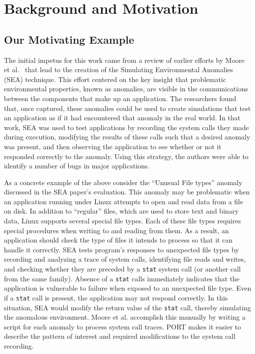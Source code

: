 \section{Background and Motivation}
\label{SEC:background}


\subsection{Our Motivating Example}
\label{sec:MotivatingExample}

The initial impetus for this work came from a review
of earlier efforts by Moore et al.~\cite{DBLP:conf/issre/MooreCFW19}
that lead to the creation of
the Simulating Environmental Anomalies (SEA) technique.
This effort centered on the key insight
that problematic
environmental properties,
known as anomalies, are visible in the
communications between the components that make up an application.
The researchers found that,
once captured,
these anomalies
could be
used to create simulations
that test
an application as if
it had encountered that anomaly
in the real world.
In that work, SEA was used to test applications
by recording the system calls they made
during execution,
modifying the results of these calls such that a desired anomaly
was present,
and then observing the application to see whether or not it
responded correctly to the anomaly.
Using this strategy, the authors were able to identify a number of bugs
in major applications.

As a concrete example of the above
consider the ``Unusual File types'' anomaly
discussed in the SEA paper's evaluation.
This anomaly may be problematic
when an application running under Linux
attempts to open and read data from a file on disk.
In addition to ``regular'' files,
which are used to store text and
binary data,
Linux supports several special file types.
Each of these file types requires special procedures when writing to and
reading from them.
As a result, an application should check the type of files it intends to
process so that it can handle it correctly.
SEA tests program's responses
to unexpected file types
by recording and analyzing a trace of system calls,
identifying file reads and writes,
and checking whether they are preceded by a {\tt stat}
system call (or another call from the same family).
Absence of a {\tt stat} calls
immediately indicates
that the application is vulnerable
to failure
when exposed to an unexpected file type.
Even if a {\tt stat} call is present,
the application may not respond correctly.
In this situation,
SEA would
modify
the return value
of the {\tt stat} call,
thereby simulating the anomalous environment.
Moore et al. accomplish this manually
by writing a script
for each anomaly
to process system call traces.
PORT makes it easier to describe
the pattern of interest
and required modifications
to the system call recording.

